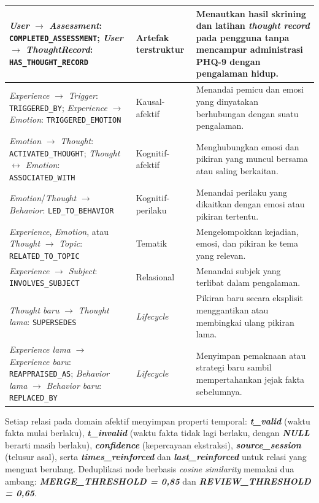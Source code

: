 \begin{longtable}{|>{\raggedright\arraybackslash}p{3.8cm}|>{\raggedright\arraybackslash}p{3.2cm}|>{\raggedright\arraybackslash}p{5.4cm}|}
\hline
\textit{User} $\rightarrow$ \textit{Assessment}: \texttt{COMPLETED\_ASSESSMENT}; \textit{User} $\rightarrow$ \textit{ThoughtRecord}: \texttt{HAS\_THOUGHT\_RECORD} & Artefak terstruktur & Menautkan hasil skrining dan latihan \textit{thought record} pada pengguna tanpa mencampur administrasi PHQ-9 dengan pengalaman hidup.\\
\hline
\textit{Experience} $\rightarrow$ \textit{Trigger}: \texttt{TRIGGERED\_BY}; \textit{Experience} $\rightarrow$ \textit{Emotion}: \texttt{TRIGGERED\_EMOTION} & Kausal-afektif & Menandai pemicu dan emosi yang dinyatakan berhubungan dengan suatu pengalaman.\\
\hline
\textit{Emotion} $\rightarrow$ \textit{Thought}: \texttt{ACTIVATED\_THOUGHT}; \textit{Thought} $\leftrightarrow$ \textit{Emotion}: \texttt{ASSOCIATED\_WITH} & Kognitif-afektif & Menghubungkan emosi dan pikiran yang muncul bersama atau saling berkaitan.\\
\hline
\textit{Emotion}/\textit{Thought} $\rightarrow$ \textit{Behavior}: \texttt{LED\_TO\_BEHAVIOR} & Kognitif-perilaku & Menandai perilaku yang dikaitkan dengan emosi atau pikiran tertentu.\\
\hline
\textit{Experience}, \textit{Emotion}, atau \textit{Thought} $\rightarrow$ \textit{Topic}: \texttt{RELATED\_TO\_TOPIC} & Tematik & Mengelompokkan kejadian, emosi, dan pikiran ke tema yang relevan.\\
\hline
\textit{Experience} $\rightarrow$ \textit{Subject}: \texttt{INVOLVES\_SUBJECT} & Relasional & Menandai subjek yang terlibat dalam pengalaman.\\
\hline
\textit{Thought baru} $\rightarrow$ \textit{Thought lama}: \texttt{SUPERSEDES} & \textit{Lifecycle} & Pikiran baru secara eksplisit menggantikan atau membingkai ulang pikiran lama.\\
\hline
\textit{Experience lama} $\rightarrow$ \textit{Experience baru}: \texttt{REAPPRAISED\_AS}; \textit{Behavior lama} $\rightarrow$ \textit{Behavior baru}: \texttt{REPLACED\_BY} & \textit{Lifecycle} & Menyimpan pemaknaan atau strategi baru sambil mempertahankan jejak fakta sebelumnya.\\
\hline
\end{longtable}
\endgroup

Setiap relasi pada domain afektif menyimpan properti temporal: \textbf{\textit{t\_valid}} (waktu fakta mulai berlaku), \textbf{\textit{t\_invalid}} (waktu fakta tidak lagi berlaku, dengan \textbf{\textit{NULL}} berarti masih berlaku), \textbf{\textit{confidence}} (kepercayaan ekstraksi), \textbf{\textit{source\_session}} (telusur asal), serta \textbf{\textit{times\_reinforced}} dan \textbf{\textit{last\_reinforced}} untuk relasi yang menguat berulang. Deduplikasi node berbasis \textit{cosine similarity} memakai dua ambang: \textbf{\textit{MERGE\_THRESHOLD = 0,85}} dan \textbf{\textit{REVIEW\_THRESHOLD = 0,65}}.


